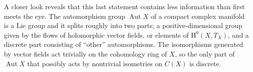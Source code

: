 \documentclass[11pt,a4paper]{amsart}
\theoremstyle{definition}
\theoremstyle{remark}
\newcommand{\Aut}{\mathop{\mathrm{Aut}}}
\def\coho#1{\mathrm{H}^{#1}}
\def\KC{C}
\begin{document}
A closer look reveals that this last statement contains less information
than first meets the eye. The automorphism group $\Aut X$ of a compact
complex manifold is a Lie group and it splits roughly into two parts; a
positive-dimensional group given by the flows of holomorphic vector
fields, or elements of $\coho{0}(X,T_X)$, and a discrete part consisting of
``other'' automorphisms. The isomorphisms generated by vector fields act
trivially on the cohomology ring of $X$, so the only part of $\Aut X$
that possibly acts by nontrivial isometries on $\KC(X)$ is discrete.





\end{document}
